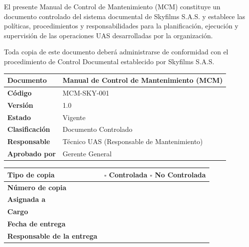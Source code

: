 

El presente Manual de Control de Mantenimiento (MCM) constituye un documento controlado del sistema documental de Skyfilms S.A.S. y establece las políticas, procedimientos y responsabilidades para la planificación, ejecución y supervisión de las operaciones UAS desarrolladas por la organización.

Toda copia de este documento deberá administrarse de conformidad con el procedimiento de Control Documental establecido por Skyfilms S.A.S.

\vspace{0.2cm}

\renewcommand{\arraystretch}{1.15}

\begin{table}[H]
\centering
\begin{tabularx}{\textwidth}{|L{5cm}|X|}
\hline
\textbf{Documento} & Manual de Control de Mantenimiento (MCM) \\ \hline
\textbf{Código} & MCM-SKY-001 \\ \hline
\textbf{Versión} & 1.0 \\ \hline
\textbf{Estado} & Vigente \\ \hline
\textbf{Clasificación} & Documento Controlado \\ \hline
\textbf{Responsable} & Técnico UAS (Responsable de Mantenimiento) \\ \hline
\textbf{Aprobado por} & Gerente General \\ \hline
\end{tabularx}
\end{table}

\vspace{0.2cm}

\renewcommand{\arraystretch}{1.15}

\begin{table}[H]
\centering
\begin{tabularx}{\textwidth}{|L{5cm}|X|}
\hline
\textbf{Tipo de copia} &
$\square$ Controlada \hspace{1cm}
$\square$ No Controlada \\ \hline

\textbf{Número de copia} & \\ \hline

\textbf{Asignada a} & \\ \hline

\textbf{Cargo} & \\ \hline

\textbf{Fecha de entrega} & \\ \hline

\textbf{Responsable de la entrega} & \\ \hline

\end{tabularx}
\end{table}

